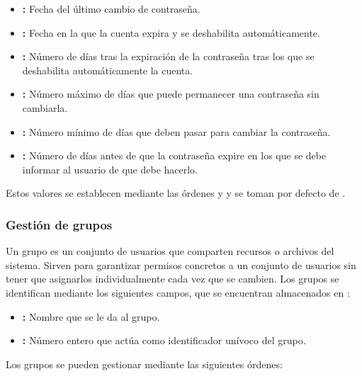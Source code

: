 \begin{itemize}
	\item{}\textbf{:} Fecha del último cambio de contraseña.
	\item{}\textbf{:} Fecha en la que la cuenta expira y se deshabilita automáticamente.
	\item{}\textbf{:} Número de días tras la expiración de la contraseña tras los que se deshabilita automáticamente la cuenta.
	\item{}\textbf{:} Número máximo de días que puede permanecer una contraseña sin cambiarla.
	\item{}\textbf{:} Número mínimo de días que deben pasar para cambiar la contraseña.
	\item{}\textbf{:} Número de días antes de que la contraseña expire en los que se debe informar al usuario de que debe hacerlo.
\end{itemize}

Estos valores se establecen mediante las órdenes  y  y se toman por defecto de .

\subsubsection{Gestión de grupos}

Un grupo es un conjunto de usuarios que comparten recursos o archivos del sistema.
Sirven para garantizar permisos concretos a un conjunto de usuarios sin tener que asignarlos individualmente cada vez que se cambien.
Los grupos se identifican mediante los siguientes campos, que se encuentran almacenados en :

\begin{itemize}
	\item{}\textbf{:} Nombre que se le da al grupo.
	\item{}\textbf{:} Número entero que actúa como identificador unívoco del grupo.
\end{itemize}

\pagebreak

Los grupos se pueden gestionar mediante las siguientes órdenes:

